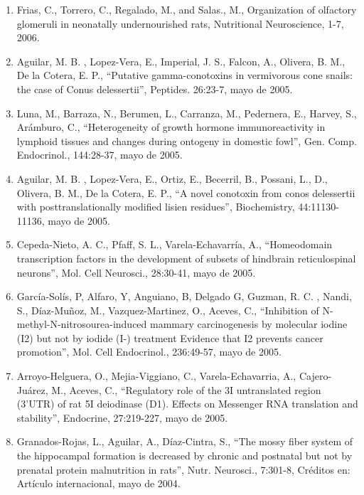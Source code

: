 \begin{enumerate}
\item Frias, C., Torrero, C., Regalado, M., and Salas., M., Organization of olfactory glomeruli in neonatally undernourished 
rats, Nutritional Neuroscience, 1-7,    2006.

\item Aguilar, M. B. , Lopez-Vera, E., Imperial, J. S., Falcon, A., Olivera, B. M., De la Cotera, E. P., “Putative 
gamma-conotoxins in vermivorous cone snails: the case of Conus delessertii”, Peptides. 26:23-7, mayo de 2005.

\item Luna, M., Barraza, N., Berumen, L., Carranza, M., Pedernera, E., Harvey, S., Arámburo, C., “Heterogeneity of growth 
hormone immunoreactivity in lymphoid tissues and changes during ontogeny in domestic fowl”, Gen. Comp. Endocrinol., 
144:28-37,    mayo de 2005.

\item Aguilar, M. B. , Lopez-Vera, E., Ortiz, E., Becerril, B., Possani, L., D., Olivera, B. M., De la Cotera,
E. P., “A novel conotoxin from conos delessertii with posttranslationally modified lisien residues”, Biochemistry, 
44:11130-11136,    mayo de 2005.

\item Cepeda-Nieto, A. C., Pfaff, S. L., Varela-Echavarría, A., “Homeodomain transcription factors in the development of 
subsets of hindbrain reticulospinal neurons”, Mol. Cell Neurosci., 28:30-41,    mayo de 
2005.

\item García-Solís, P, Alfaro, Y, Anguiano, B, Delgado G, Guzman, R. C. , Nandi, S., Díaz-Muñoz, M., Vazquez-Martinez, O., 
Aceves, C., “Inhibition of N-methyl-N-nitrosourea-induced mammary
carcinogenesis by molecular iodine (I2) but not by iodide (I-) treatment Evidence that I2 prevents cancer promotion”, Mol. 
Cell Endocrinol., 236:49-57,    mayo de 2005.

\item Arroyo-Helguera, O., Mejia-Viggiano, C., Varela-Echavarria, A., Cajero-Juárez, M., Aceves, C., “Regulatory role of the 
3I 
untranslated region (3’UTR) of rat 5I deiodinase (D1). Effects on Messenger RNA translation and stability”, Endocrine, 
27:219-227,    mayo de 2005.

\item Granados-Rojas, L., Aguilar, A., Díaz-Cintra, S., “The mossy fiber system of the hippocampal formation is decreased by 
chronic and postnatal but not by prenatal protein malnutrition in rats”, Nutr. Neurosci., 7:301-8, Créditos en: Artículo 
internacional, mayo de 2004.


\end{enumerate}

